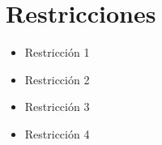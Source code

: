 \section{Restricciones}
\label{section:restricciones}
\begin{itemize}
	\item Restricción 1
	\item Restricción 2
	\item Restricción 3
	\item Restricción 4
\end{itemize}
